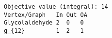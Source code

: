 \begin{verbatim}
Objective value (integral): 14
Vertex/Graph   In Out OA 
Glycolaldehyde 2  0   0  
g_{12}         1  2   1  
\end{verbatim}
